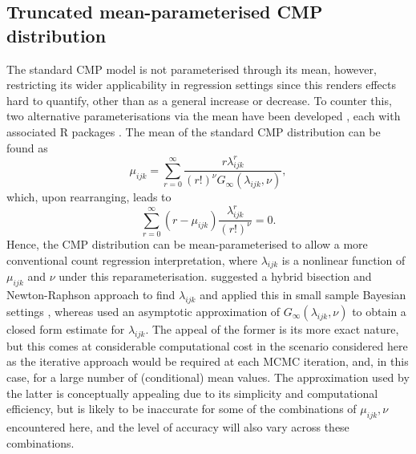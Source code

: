 \documentclass{statsoc}
\begin{document}
\subsection{Truncated mean-parameterised CMP distribution}
The standard CMP model is not parameterised through its mean, however, restricting its wider applicability in regression settings since this renders effects hard to quantify, other than as a general increase or decrease. To counter this, two alternative parameterisations via the mean have been developed \citep{Huang2017, Ribeiro2018, Huang2019}, each with associated R packages \citep{mpcmp, cmpreg}. The mean of the standard CMP distribution can be found as
\[
\mu_{ijk} = \sum_{r=0}^{\infty} \frac{r \lambda_{ijk}^r}{(r!)^{\nu}G_\infty(\lambda_{ijk}, \nu)},
\]
which, upon rearranging, leads to
\begin{equation}\label{eq:lam_nonlin}
\sum_{r=0}^{\infty} (r - \mu_{ijk})  \frac{\lambda_{ijk}^r}{(r!)^{\nu}}= 0.
\end{equation}
Hence, the CMP distribution can be mean-parameterised to allow a more conventional count regression interpretation, where
$\lambda_{ijk}$ is a nonlinear function of $\mu_{ijk}$ and $\nu$ under this reparameterisation. \cite{Huang2017} suggested a hybrid bisection and Newton-Raphson approach to find $\lambda_{ijk}$ and applied this in small sample Bayesian settings \citep{Huang2019}, whereas \cite{Ribeiro2018} used an asymptotic approximation of $G_\infty(\lambda_{ijk}, \nu)$ to obtain a closed form estimate for $\lambda_{ijk}$. The appeal of the former is its more exact nature, but this comes at considerable computational cost in the scenario considered here as the iterative approach would be required at each MCMC iteration, and, in this case, for a large number of (conditional) mean values. The approximation used by the latter is conceptually appealing due to its simplicity and computational efficiency, but is likely to be inaccurate for some of the combinations of $\mu_{ijk}, \nu$ encountered here, and the level of accuracy will also vary across these combinations. 
\end{document}
